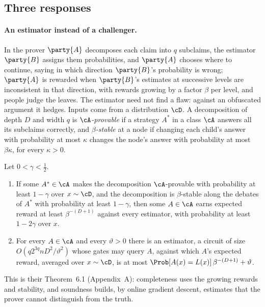 \begin{refsection}
\subsection{Three responses}\label{sec:efficientdebate:responses}

\paragraph{An estimator instead of a challenger.} In  \parencite{BrownCohenEtAl2026} the prover $\party{A}$ decomposes each claim into $q$ subclaims, the estimator $\party{B}$ assigns them probabilities, and $\party{A}$ chooses where to continue, saying in which direction $\party{B}$'s probability is wrong; $\party{A}$ is rewarded when $\party{B}$'s estimates at successive levels are inconsistent in that direction, with rewards growing by a factor $\beta$ per level, and people judge the leaves. The estimator need not find a flaw: against an obfuscated argument it hedges. Inputs come from a distribution $\cD$. A decomposition of depth $D$ and width $q$ is \emph{$\cA$-provable} if a strategy $A^*$ in a class $\cA$ answers all its subclaims correctly, and \emph{$\beta$-stable} at a node if changing each child's answer with probability at most $\kappa$ changes the node's answer with probability at most $\beta\kappa$, for every $\kappa>0$.

\begin{theorem}\label{thm:efficientdebate:estimator}
Let $0<\gamma<\frac12$.
\begin{enumerate}
\item If some $A^*\in\cA$ makes the decomposition $\cA$-provable with probability at least $1-\gamma$ over $x\sim\cD$, and the decomposition is $\beta$-stable along the debates of $A^*$ with probability at least $1-\gamma$, then some $A\in\cA$ earns expected reward at least $\beta^{-(D+1)}$ against every estimator, with probability at least $1-2\gamma$ over $x$.
\item For every $A\in\cA$ and every $\vartheta>0$ there is an estimator, a circuit of size $O(q2^{3q}nD^2/\vartheta^2)$ whose gates may query $A$, against which $A$'s expected reward, averaged over $x\sim\cD$, is at most $\Prob[A(x)=L(x)]\,\beta^{-(D+1)}+\vartheta$.
\end{enumerate}
\end{theorem}

\begin{proofsketch}
This is their Theorem~6.1 (Appendix~A): completeness uses the growing rewards and stability, and soundness builds, by online gradient descent, estimates that the prover cannot distinguish from the truth.
\end{proofsketch}


\end{refsection}
